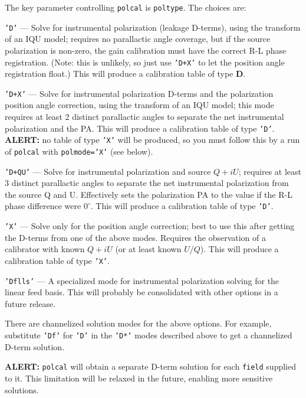 The key parameter controlling {\tt polcal} is {\tt poltype}.  The
choices are:
\begin{description}
\item{\tt 'D'} --- Solve for instrumental polarization (leakage D-terms),
using the transform of an IQU model; requires no
parallactic angle coverage, but if the source polarization is non-zero,
the gain calibration must have the correct R-L phase registration.
(Note: this is unlikely, so just use {\tt 'D+X'} to let the position
angle registration float.) This will produce a calibration table of
type {\bf D}.

\item{\tt 'D+X'} --- Solve for instrumental polarization D-terms and
the polarization position angle correction, using the transform of an
IQU model; this mode requires at least 2 distinct
parallactic angles to separate the net instrumental polarization and
the PA. This will produce a calibration table of
type {\tt 'D'}. {\bf ALERT:} no table of type {\tt 'X'} will be
produced, so you must follow this by a run of {\tt polcal} with
{\tt polmode='X'} (see below).

\item{\tt 'D+QU'} --- Solve for instrumental polarization and source 
$Q+iU$; requires at least 3 distinct parallactic angles to separate
the net instrumental polarization from the source Q and U.
Effectively sets the polarization PA to the value if the R-L phase
difference were $0^\circ$.  This will produce a calibration table of
type {\tt 'D'}. 

\item{\tt 'X'} --- Solve only for the position angle correction; best to use
this after getting the D-terms from one of the above modes.  Requires
the observation of a calibrator with known $Q+iU$ (or at least known $U/Q$).
This will produce a calibration table of type {\tt 'X'}. 

\item{\tt 'Dflls'} --- A specialized mode for instrumental
polarization solving for the linear feed basis.  This will probably
be consolidated with other options in a future release.

\end{description}

There are channelized solution modes for the above options.  For
example, substitute {\tt 'Df'} for {\tt 'D'} in the {\tt 'D*'} modes 
described above to get a channelized D-term solution.  

{\bf ALERT:} {\tt polcal} will obtain a separate D-term solution for
each {\tt field} supplied to it.  This limitation will be relaxed in 
the future, enabling more sensitive solutions.

